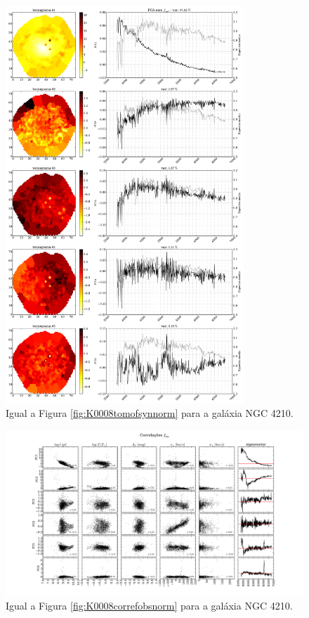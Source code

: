 \begin{figure}
    \includegraphics[width=0.8\textwidth]{figuras/K0518-tomo-syn-norm.pdf}
    \caption[Tomogramas de 1 a 5 para o cubo $f_{syn}$ - NGC 4210.]
    {Igual a Figura \ref{fig:K0008tomofsynnorm} para a galáxia NGC 4210.}
    \label{fig:K0518tomofsynnorm}
\end{figure}

\begin{figure}
    \includegraphics[width=1.3\textwidth, angle=-90]{figuras/K0518-correl-f_obs_norm-PCvsPhys.pdf}
	\caption[Correlações PCs vs. par\^ametros f\'isicos - $f_{obs}$ - NGC 4210.]
	{Igual a Figura \ref{fig:K0008correfobsnorm} para a galáxia NGC 4210.}
    \label{fig:K0518correfobsnorm}
\end{figure}

